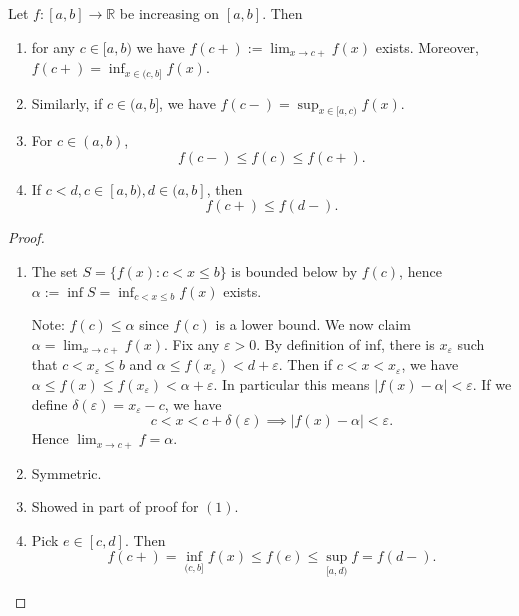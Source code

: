 \begin{proposition}
	Let $f: [a,b] \to \mathbb{R}$ be increasing on $[a,b]$. Then 
	\begin{enumerate}
		\item 
	for any $c \in [a,b)$ we have $f(c+):= \lim_{x \to c+} f(x)$ exists. Moreover, $f(c+) = \operatorname{inf}_{x \in (c,b]}f(x)$.
\item 
	Similarly, if $c \in (a,b]$, we have $f(c-) = \operatorname{sup}_{x \in [a,c)}f(x)$.
\item For $c \in (a,b)$,
	\[
	f(c-) \le f(c) \le f(c+)
.\] 
\item If $c < d, c \in [a,b), d \in (a,b]$, then
	\[
		f(c+) \le f(d-)
	.\] 
	\end{enumerate}
\end{proposition}
\begin{proof}
	\begin{enumerate}
		\item The set $S = \{f(x): c < x \le b\}$ is bounded below by $f(c)$, hence $\alpha:= \operatorname{inf} S = \operatorname{inf}_{c<x\le b}f(x)$ exists.

			Note: $f(c)\le \alpha$ since $f(c)$ is a lower bound. We now claim $\alpha = \lim_{x \to c+} f(x)$. Fix any $\varepsilon>0$. By definition of inf, there is $x_\varepsilon$ such that $c<x_\varepsilon\le b$ and $\alpha \le f(x_\varepsilon)< d + \varepsilon$. 
			Then if $c < x < x_\varepsilon$, we have $\alpha \le f(x) \le f(x_\varepsilon) < \alpha + \varepsilon$.
			In particular this means  $|f(x) - \alpha| < \varepsilon$. If we define $\delta(\varepsilon) = x_\varepsilon - c$, we have
			\[
				c<x<c+\delta(\varepsilon) \implies |f(x) - \alpha| < \varepsilon
			.\] 
			Hence $\lim_{x \to c+} f = \alpha$.
	\item Symmetric.
	\item Showed in part of proof for $(1)$.
	\item Pick $e \in [c,d]$. Then
		\[
			f(c+) = \operatorname{inf}_{(c,b]} f(x) \le  f(e) \le  \operatorname{sup}_{[a,d)} f = f(d-)
		.\] 
	\end{enumerate}
\end{proof}

